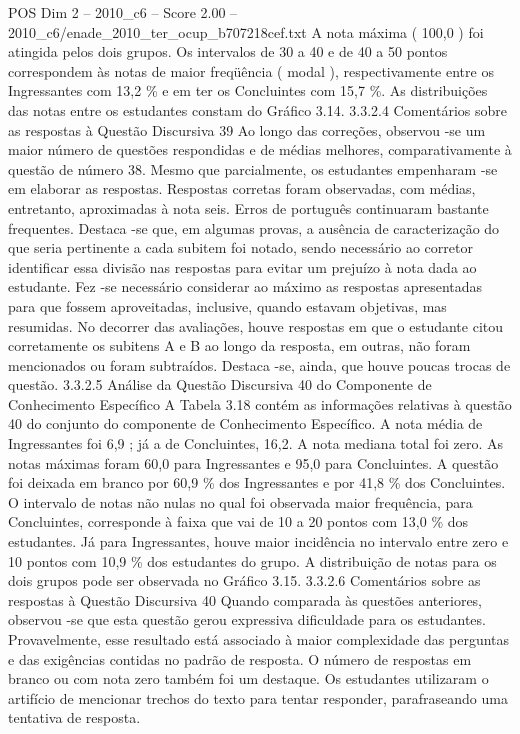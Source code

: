 \begin{textsample}{POS Dim 2 – 2010\_c6 – Score 2.00 – 2010\_c6/enade\_2010\_ter\_ocup\_b707218cef.txt}
A nota máxima ( 100,0 ) foi atingida pelos dois grupos.
Os intervalos de 30 a 40 e de 40 a 50 pontos correspondem às notas de maior freqüência ( modal ), respectivamente entre os Ingressantes com 13,2 \% e em ter os Concluintes com 15,7 \%.
As distribuições das notas entre os estudantes constam do Gráfico 3.14. 3.3.2.4 Comentários sobre as respostas à Questão Discursiva 39 Ao longo das correções, observou -se um maior número de questões respondidas e de médias melhores, comparativamente à questão de número 38.
Mesmo que parcialmente, os estudantes empenharam -se em elaborar as respostas.
Respostas corretas foram observadas, com médias, entretanto, aproximadas à nota seis.
Erros de português continuaram bastante frequentes.
Destaca -se que, em algumas provas, a ausência de caracterização do que seria pertinente a cada subitem foi notado, sendo necessário ao corretor identificar essa divisão nas respostas para evitar um prejuízo à nota dada ao estudante.
Fez -se necessário considerar ao máximo as respostas apresentadas para que fossem aproveitadas, inclusive, quando estavam objetivas, mas resumidas.
No decorrer das avaliações, houve respostas em que o estudante citou corretamente os subitens A e B ao longo da resposta, em outras, não foram mencionados ou foram subtraídos.
Destaca -se, ainda, que houve poucas trocas de questão. 3.3.2.5 Análise da Questão Discursiva 40 do Componente de Conhecimento Específico A Tabela 3.18 contém as informações relativas à questão 40 do conjunto do componente de Conhecimento Específico.
A nota média de Ingressantes foi 6,9 ; já a de Concluintes, 16,2.
A nota mediana total foi zero.
As notas máximas foram 60,0 para Ingressantes e 95,0 para Concluintes.
A questão foi deixada em branco por 60,9 \% dos Ingressantes e por 41,8 \% dos Concluintes.
O intervalo de notas não nulas no qual foi observada maior frequência, para Concluintes, corresponde à faixa que vai de 10 a 20 pontos com 13,0 \% dos estudantes.
Já para Ingressantes, houve maior incidência no intervalo entre zero e 10 pontos com 10,9 \% dos estudantes do grupo.
A distribuição de notas para os dois grupos pode ser observada no Gráfico 3.15. 3.3.2.6 Comentários sobre as respostas à Questão Discursiva 40 Quando comparada às questões anteriores, observou -se que esta questão gerou expressiva dificuldade para os estudantes.
Provavelmente, esse resultado está associado à maior complexidade das perguntas e das exigências contidas no padrão de resposta.
O número de respostas em branco ou com nota zero também foi um destaque.
Os estudantes utilizaram o artifício de mencionar trechos do texto para tentar responder, parafraseando uma tentativa de resposta.

\end{textsample}
